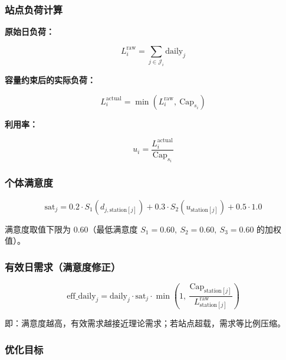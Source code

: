 \documentclass[UTF8]{ctexart}
\begin{document}
\subsubsection{站点负荷计算}

\textbf{原始日负荷：}

\begin{equation}
L_i^{\text{raw}} = \sum_{j\in\mathcal{J}_i} \text{daily}_j \tag{2.7}
\end{equation}

\textbf{容量约束后的实际负荷：}

\begin{equation}
L_i^{\text{actual}} = \min\left(L_i^{\text{raw}},\ \text{Cap}_{s_i}\right) \tag{2.8}
\end{equation}

\textbf{利用率：}

\begin{equation}
u_i = \frac{L_i^{\text{actual}}}{\text{Cap}_{s_i}} \tag{2.9}
\end{equation}

\subsubsection{个体满意度}

\begin{equation}
\text{sat}_j = 0.2 \cdot S_1(d_{j,\text{station}[j]}) + 0.3 \cdot S_2(u_{\text{station}[j]}) + 0.5 \cdot 1.0 \tag{2.10}
\end{equation}

满意度取值下限为 $0.60$（最低满意度 $S_1=0.60,\ S_2=0.60,\ S_3=0.60$ 的加权值）。

\subsubsection{有效日需求（满意度修正）}

\begin{equation}
\text{eff\_daily}_j = \text{daily}_j \cdot \text{sat}_j \cdot \min\left(1,\ \frac{\text{Cap}_{\text{station}[j]}}{L_{\text{station}[j]}^{\text{raw}}}\right) \tag{2.11}
\end{equation}

即：满意度越高，有效需求越接近理论需求；若站点超载，需求等比例压缩。

\subsubsection{优化目标}
\end{document}
